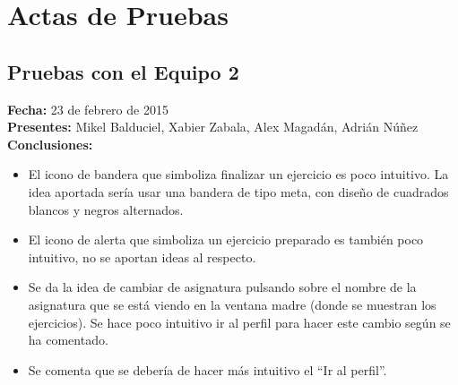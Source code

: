 \pagestyle{fancy}

\chapter{Actas de Pruebas}
\label{anexo-b}

\section*{Pruebas con el Equipo 2}

\textbf{Fecha:} 23 de febrero de 2015\\

\textbf{Presentes:} Mikel Balduciel, Xabier Zabala, Alex Magadán, Adrián Núñez\\

\textbf{Conclusiones:}

\begin{itemize}
\item El icono de bandera que simboliza finalizar un ejercicio es poco intuitivo. La idea aportada sería usar una bandera de tipo meta, con diseño de cuadrados blancos y negros alternados.

\item El icono de alerta que simboliza un ejercicio preparado es también poco intuitivo, no se aportan ideas al respecto.

\item Se da la idea de cambiar de asignatura pulsando sobre el nombre de la asignatura que se está viendo en la ventana madre (donde se muestran los ejercicios). Se hace poco intuitivo ir al perfil para hacer este cambio según se ha comentado.

\item Se comenta que se debería de hacer más intuitivo el “Ir al perfil”.
\end{itemize}